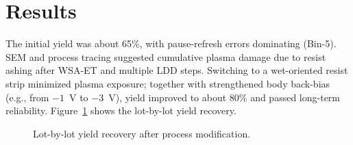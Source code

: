 \section{Results}

The initial yield was about 65\%, with pause-refresh errors dominating (Bin-5).
SEM and process tracing suggested cumulative plasma damage due to resist ashing after WSA-ET and multiple LDD steps.
Switching to a wet-oriented resist strip minimized plasma exposure; together with strengthened body back-bias (e.g., from $-1$~V to $-3$~V), yield improved to about 80\% and passed long-term reliability.
Figure~\ref{fig:yield} shows the lot-by-lot yield recovery.

\usepackage{pgfplots}
\pgfplotsset{compat=1.18}
\usepackage{pgfplotstable}

\begin{figure}[!t]
  \centering
  \yieldtable
  \caption{Lot-by-lot yield recovery after process modification.}
  \label{fig:yield}
\end{figure}
